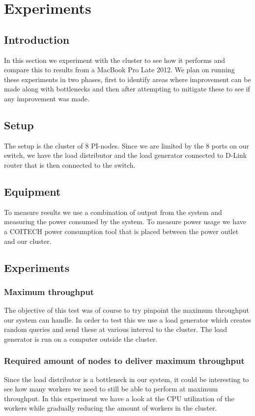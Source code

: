 
\clearpage
\section{Experiments}

\subsection{Introduction}
In this section we experiment with the cluster to see how it performs and compare this to results from a MacBook Pro Late 2012. We plan on running these experiments in two phases, first to identify areas where improvement can be made along with bottlenecks and then after attempting to mitigate these to see if any improvement was made.

\subsection{Setup}
The setup is the cluster of 8 PI-nodes. Since we are limited by the 8 ports on our switch, we have the load distributor and the load generator connected to D-Link router that is then connected to the switch. 

\subsection{Equipment}
To measure results we use a combination of output from the system and measuring the power consumed by the system. To measure power usage we have a COITECH power consumption tool that is placed between the power outlet and our cluster.  

\subsection{Experiments}

\subsubsection{Maximum throughput} 
The objective of this test was of course to try pinpoint the maximum throughput our system can handle. In order to test this we use a load generator which creates random queries and send these at various interval to the cluster. The load generator is run on a computer outside the cluster. 

\subsubsection{Required amount of nodes to deliver maximum throughput}
Since the load distributor is a bottleneck in our system, it could be interesting to see how many workers we need to still be able to perform at maximum throughput. In this experiment we have a look at the CPU utilization of the workers while gradually reducing the amount of workers in the cluster.

